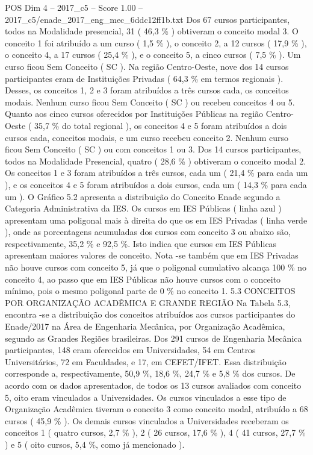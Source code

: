 \begin{textsample}{POS Dim 4 – 2017\_c5 – Score 1.00 – 2017\_c5/enade\_2017\_eng\_mec\_6ddc12ff1b.txt}
Dos 67 cursos participantes, todos na Modalidade presencial, 31 ( 46,3 \% ) obtiveram o conceito modal 3.
O conceito 1 foi atribuído a um curso ( 1,5 \% ), o conceito 2, a 12 cursos ( 17,9 \% ), o conceito 4, a 17 cursos ( 25,4 \% ), e o conceito 5, a cinco cursos ( 7,5 \% ).
Um curso ficou Sem Conceito ( SC ).
Na região Centro-Oeste, nove dos 14 cursos participantes eram de Instituições Privadas ( 64,3 \% em termos regionais ).
Desses, os conceitos 1, 2 e 3 foram atribuídos a três cursos cada, os conceitos modais.
Nenhum curso ficou Sem Conceito ( SC ) ou recebeu conceitos 4 ou 5.
Quanto aos cinco cursos oferecidos por Instituições Públicas na região Centro-Oeste ( 35,7 \% do total regional ), os conceitos 4 e 5 foram atribuídos a dois cursos cada, conceitos modais, e um curso recebeu conceito 2.
Nenhum curso ficou Sem Conceito ( SC ) ou com conceitos 1 ou 3.
Dos 14 cursos participantes, todos na Modalidade Presencial, quatro ( 28,6 \% ) obtiveram o conceito modal 2.
Os conceitos 1 e 3 foram atribuídos a três cursos, cada um ( 21,4 \% para cada um ), e os conceitos 4 e 5 foram atribuídos a dois cursos, cada um ( 14,3 \% para cada um ).
O Gráfico 5.2 apresenta a distribuição do Conceito Enade segundo a Categoria Administrativa da IES.
Os cursos em IES Públicas ( linha azul ) apresentam uma poligonal mais à direita do que os em IES Privadas ( linha verde ), onde as porcentagens acumuladas dos cursos com conceito 3 ou abaixo são, respectivamente, 35,2 \% e 92,5 \%.
Isto indica que cursos em IES Públicas apresentam maiores valores de conceito.
Nota -se também que em IES Privadas não houve cursos com conceito 5, já que o poligonal cumulativo alcança 100 \% no conceito 4, ao passo que em IES Públicas não houve cursos com o conceito mínimo, pois o mesmo poligonal parte de 0 \% no conceito 1. 5.3 CONCEITOS POR ORGANIZAÇÃO ACADÊMICA E GRANDE REGIÃO Na Tabela 5.3, encontra -se a distribuição dos conceitos atribuídos aos cursos participantes do Enade/2017 na Área de Engenharia Mecânica, por Organização Acadêmica, segundo as Grandes Regiões brasileiras.
Dos 291 cursos de Engenharia Mecânica participantes, 148 eram oferecidos em Universidades, 54 em Centros Universitários, 72 em Faculdades, e 17, em CEFET/IFET.
Essa distribuição corresponde a, respectivamente, 50,9 \%, 18,6 \%, 24,7 \% e 5,8 \% dos cursos.
De acordo com os dados apresentados, de todos os 13 cursos avaliados com conceito 5, oito eram vinculados a Universidades.
Os cursos vinculados a esse tipo de Organização Acadêmica tiveram o conceito 3 como conceito modal, atribuído a 68 cursos ( 45,9 \% ).
Os demais cursos vinculados a Universidades receberam os conceitos 1 ( quatro cursos, 2,7 \% ), 2 ( 26 cursos, 17,6 \% ), 4 ( 41 cursos, 27,7 \% ) e 5 ( oito cursos, 5,4 \%, como já mencionado ).

\end{textsample}
